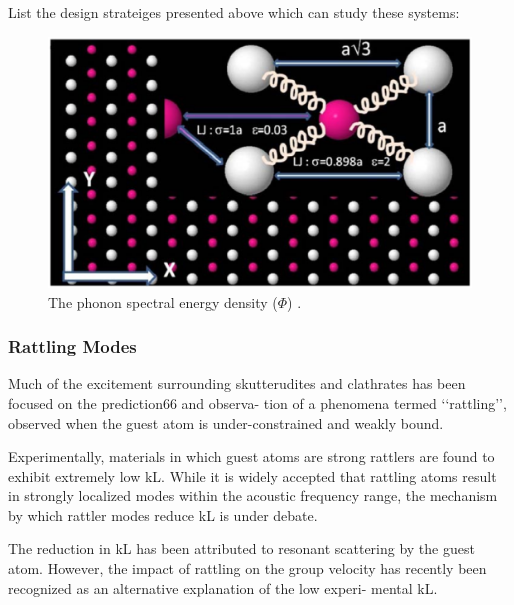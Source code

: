 \documentclass[letterpaper,12pt]{article}
\begin{document}
List the design strateiges presented above which can study these systems:


\begin{figure}
\begin{center}
\includegraphics[scale=0.25]{skutt_lj_model.eps}
\vspace*{-5mm}
\end{center}
\caption{\label{F:PEAK_COMPARE} The phonon spectral energy density ($\Phi$) .}
\end{figure}

\subsubsection{\label{S-validation-samples}Rattling Modes}

Much of the excitement surrounding
skutterudites and clathrates has been
focused on the prediction66 and observa-
tion of a phenomena termed
‘‘rattling’’, observed when the guest atom
is under-constrained and weakly bound.\cite{keppens1998,Sales_Chakoumakos_Mandrus_Sharp_1999,doi:10.1021/ja063695y}

Experimentally, materials in which guest
atoms are strong rattlers are found to
exhibit extremely low kL.\cite{Sales_Chakoumakos_Mandrus_Sharp_1999,qiu:063713} While it is
widely accepted that rattling atoms result
in strongly localized modes within the
acoustic frequency range, the mechanism
by which rattler modes reduce kL is under
debate.

The reduction in kL
has been attributed to resonant scattering
by the guest atom.\cite{PhysRevLett.82.779} However, the impact
of rattling on the group velocity has
recently been recognized as an alternative
explanation of the low experi-
mental kL.\cite{Yang_Chen_2006,Christensen2008}
\end{document}
